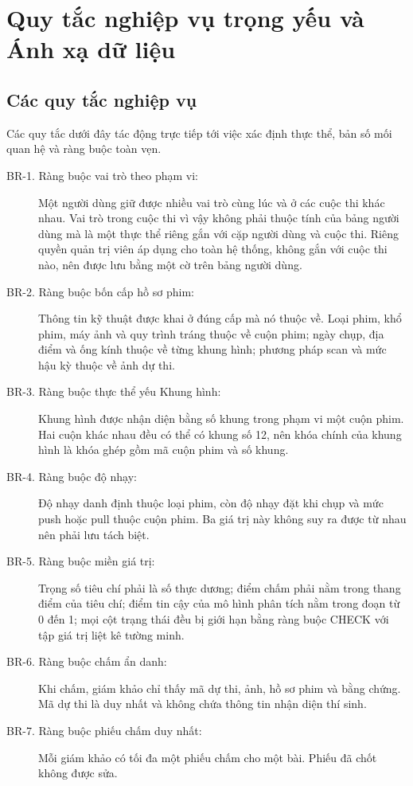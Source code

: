 \section{Quy tắc nghiệp vụ trọng yếu và Ánh xạ dữ liệu}

\subsection{Các quy tắc nghiệp vụ}

Các quy tắc dưới đây tác động trực tiếp tới việc xác định thực thể, bản số mối quan hệ và ràng buộc toàn vẹn.

\begin{description}
    \item[BR-1. Ràng buộc vai trò theo phạm vi:] Một người dùng giữ được nhiều vai trò cùng lúc và ở các cuộc thi khác nhau. Vai trò trong cuộc thi vì vậy không phải thuộc tính của bảng người dùng mà là một thực thể riêng gắn với cặp người dùng và cuộc thi. Riêng quyền quản trị viên áp dụng cho toàn hệ thống, không gắn với cuộc thi nào, nên được lưu bằng một cờ trên bảng người dùng.
    \item[BR-2. Ràng buộc bốn cấp hồ sơ phim:] Thông tin kỹ thuật được khai ở đúng cấp mà nó thuộc về. Loại phim, khổ phim, máy ảnh và quy trình tráng thuộc về cuộn phim; ngày chụp, địa điểm và ống kính thuộc về từng khung hình; phương pháp scan và mức hậu kỳ thuộc về ảnh dự thi.
    \item[BR-3. Ràng buộc thực thể yếu Khung hình:] Khung hình được nhận diện bằng số khung trong phạm vi một cuộn phim. Hai cuộn khác nhau đều có thể có khung số 12, nên khóa chính của khung hình là khóa ghép gồm mã cuộn phim và số khung.
    \item[BR-4. Ràng buộc độ nhạy:] Độ nhạy danh định thuộc loại phim, còn độ nhạy đặt khi chụp và mức push hoặc pull thuộc cuộn phim. Ba giá trị này không suy ra được từ nhau nên phải lưu tách biệt.
    \item[BR-5. Ràng buộc miền giá trị:] Trọng số tiêu chí phải là số thực dương; điểm chấm phải nằm trong thang điểm của tiêu chí; điểm tin cậy của mô hình phân tích nằm trong đoạn từ 0 đến 1; mọi cột trạng thái đều bị giới hạn bằng ràng buộc CHECK với tập giá trị liệt kê tường minh.
    \item[BR-6. Ràng buộc chấm ẩn danh:] Khi chấm, giám khảo chỉ thấy mã dự thi, ảnh, hồ sơ phim và bằng chứng. Mã dự thi là duy nhất và không chứa thông tin nhận diện thí sinh.
    \item[BR-7. Ràng buộc phiếu chấm duy nhất:] Mỗi giám khảo có tối đa một phiếu chấm cho một bài. Phiếu đã chốt không được sửa.

\end{description}
